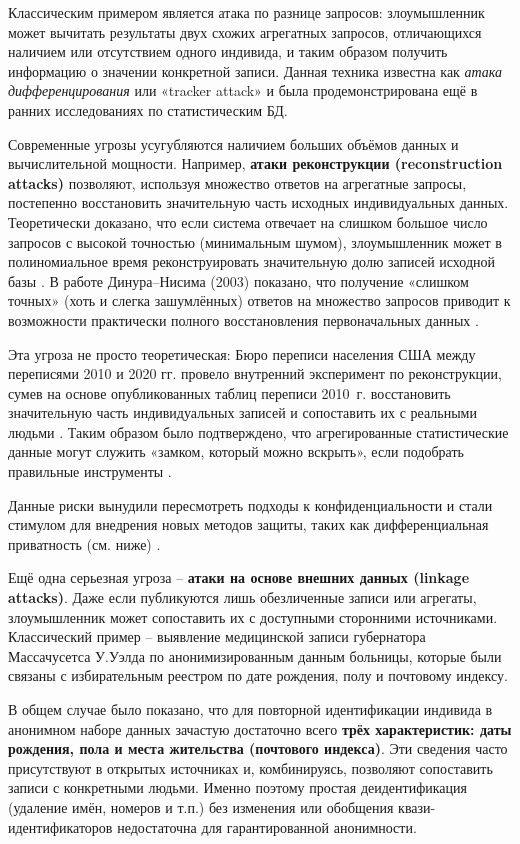 Классическим примером является атака по разнице запросов: злоумышленник может вычитать
результаты двух схожих агрегатных запросов, отличающихся наличием или отсутствием одного
индивида, и таким образом получить информацию о значении конкретной записи. Данная техника
известна как \textit{атака дифференцирования} или «tracker attack» и была
продемонстрирована ещё в ранних исследованиях по статистическим БД.

Современные угрозы усугубляются наличием больших объёмов данных и вычислительной мощности.
Например, \textbf{атаки реконструкции (reconstruction attacks)} позволяют, используя
множество ответов на агрегатные запросы, постепенно восстановить значительную часть
исходных индивидуальных данных. Теоретически доказано, что если система отвечает на
слишком большое число запросов с высокой точностью (минимальным шумом), злоумышленник
может в полиномиальное время реконструировать значительную долю записей исходной базы
\autocite{differentialprivacy-org}. В работе Динура–Нисима (2003) показано, что получение
«слишком точных» (хоть и слегка зашумлённых) ответов на множество запросов приводит к
возможности практически полного восстановления первоначальных данных
\autocite{differentialprivacy-org}.

Эта угроза не просто теоретическая: Бюро переписи населения США между переписями 2010 и
2020 гг. провело внутренний эксперимент по реконструкции, сумев на основе опубликованных
таблиц переписи 2010~г. восстановить значительную часть индивидуальных записей и
сопоставить их с реальными людьми \autocite{cornell-edu}. Таким образом было подтверждено,
что агрегированные статистические данные могут служить «замком, который можно вскрыть»,
если подобрать правильные инструменты \autocite{cornell-edu}.

Данные риски вынудили пересмотреть подходы к конфиденциальности и стали стимулом для
внедрения новых методов защиты, таких как дифференциальная приватность (см. ниже)
\autocite{cornell-edu}.

Ещё одна серьезная угроза – \textbf{атаки на основе внешних данных (linkage attacks)}.
Даже если публикуются лишь обезличенные записи или агрегаты, злоумышленник может
сопоставить их с доступными сторонними источниками. Классический пример – выявление
медицинской записи губернатора Массачусетса У.Уэлда по анонимизированным данным больницы,
которые были связаны с избирательным реестром по дате рождения, полу и почтовому индексу.

В общем случае было показано, что для повторной идентификации индивида в анонимном наборе
данных зачастую достаточно всего \textbf{трёх характеристик: даты рождения, пола и места
жительства (почтового индекса)}. Эти сведения часто присутствуют в открытых источниках и,
комбинируясь, позволяют сопоставить записи с конкретными людьми. Именно поэтому простая
деидентификация (удаление имён, номеров и т.п.) без изменения или обобщения квази-
идентификаторов недостаточна для гарантированной анонимности.


